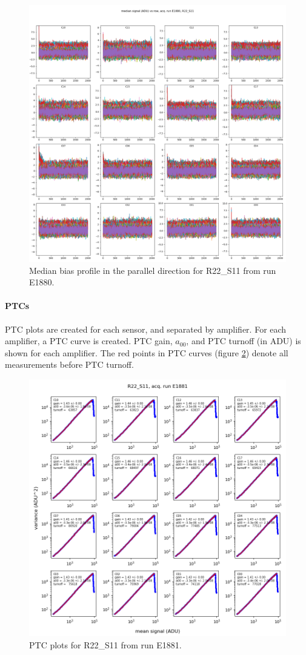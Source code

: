 \begin{figure}
    \centering
    \includegraphics[width=0.8\linewidth]{figures/ReferenceFigures/bias_parallel_profile_plots_LSSTCam_R22_S11_u_lsstccs_eo_bias_stability_E1880_w_2024_35_20241101T020021Z.png}
    \caption{Median bias profile in the parallel direction for R22\_S11 from run E1880.}
    \label{fig:ref:biasProfile}
\end{figure}
\clearpage
\paragraph{PTCs}

PTC plots are created for each sensor, and separated by amplifier. For each amplifier, a PTC curve is created. PTC gain, $a_{00}$, and PTC turnoff (in ADU) is shown for each amplifier. The red points in PTC curves (figure \ref{fig:ref:PTCs}) denote all measurements before PTC turnoff.

\begin{figure}
    \centering
    \includegraphics[width=0.8\linewidth]{figures/ReferenceFigures/ptc_plots_LSSTCam_R22_S11_u_lsstccs_eo_ptc_plots_E1881_w_2024_35_20241105T131208Z.png}
    \caption{PTC plots for R22\_S11 from run E1881.}
    \label{fig:ref:PTCs}
\end{figure}
\clearpage

